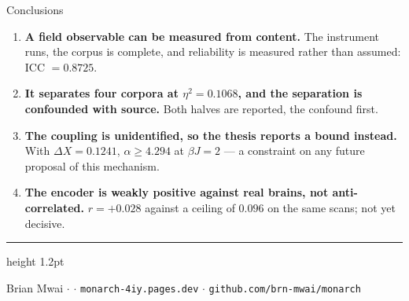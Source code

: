 \documentclass[aspectratio=169,11pt]{beamer}
\begin{document}
\begin{frame}{Conclusions}
\vspace{0.6em}
\begin{enumerate}
\item \textbf{A field observable can be measured from content.} The instrument runs, the
corpus is complete, and reliability is measured rather than assumed: ICC $= 0.8725$.

\vspace{0.45em}
\item \textbf{It separates four corpora at $\eta^2 = 0.1068$, and the separation is
confounded with source.} Both halves are reported, the confound first.

\vspace{0.45em}
\item \textbf{The coupling is unidentified, so the thesis reports a bound instead.} With
$\Delta X = 0.1241$, $\alpha \ge 4.294$ at $\beta J = 2$ --- a constraint on any future
proposal of this mechanism.

\vspace{0.45em}
\item \textbf{The encoder is weakly positive against real brains, not anti-correlated.}
$r = +0.028$ against a ceiling of $0.096$ on the same scans; not yet decisive.
\end{enumerate}

\vspace{1.0em}
{\color{mist}\hrule height 1.2pt}
\vspace{0.6em}
{\color{slate}\small Brian Mwai \;$\cdot$ \;$\cdot$\;
\texttt{monarch-4iy.pages.dev} \;$\cdot$\; \texttt{github.com/brn-mwai/monarch}}
\end{frame}
\end{document}
